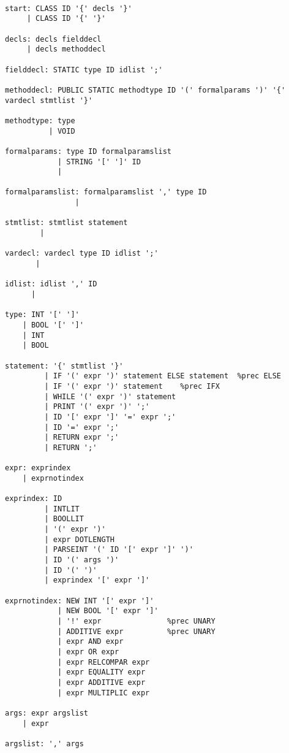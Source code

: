 \documentclass[11pt,a4paper]{article}
\begin{document}
\begin{lstlisting}

start: CLASS ID '{' decls '}'
     | CLASS ID '{' '}'

decls: decls fielddecl
     | decls methoddecl

fielddecl: STATIC type ID idlist ';'

methoddecl: PUBLIC STATIC methodtype ID '(' formalparams ')' '{' vardecl stmtlist '}'

methodtype: type 
          | VOID
          
formalparams: type ID formalparamslist
            | STRING '[' ']' ID
            |

formalparamslist: formalparamslist ',' type ID   
                |

stmtlist: stmtlist statement
        |

vardecl: vardecl type ID idlist ';'
       |

idlist: idlist ',' ID
      |

type: INT '[' ']'
    | BOOL '[' ']'
    | INT
    | BOOL

statement: '{' stmtlist '}'
         | IF '(' expr ')' statement ELSE statement  %prec ELSE
         | IF '(' expr ')' statement    %prec IFX   
         | WHILE '(' expr ')' statement
         | PRINT '(' expr ')' ';'
         | ID '[' expr ']' '=' expr ';' 
         | ID '=' expr ';'
         | RETURN expr ';'
         | RETURN ';'         

expr: exprindex
    | exprnotindex
	
exprindex: ID
         | INTLIT
         | BOOLLIT
         | '(' expr ')'
         | expr DOTLENGTH
         | PARSEINT '(' ID '[' expr ']' ')'
         | ID '(' args ')'
         | ID '(' ')'
         | exprindex '[' expr ']'

exprnotindex: NEW INT '[' expr ']'
            | NEW BOOL '[' expr ']'
            | '!' expr               %prec UNARY
            | ADDITIVE expr          %prec UNARY
            | expr AND expr
            | expr OR expr
            | expr RELCOMPAR expr
            | expr EQUALITY expr
            | expr ADDITIVE expr
            | expr MULTIPLIC expr

args: expr argslist
    | expr
 
argslist: ',' args

\end{lstlisting}
\end{document}
